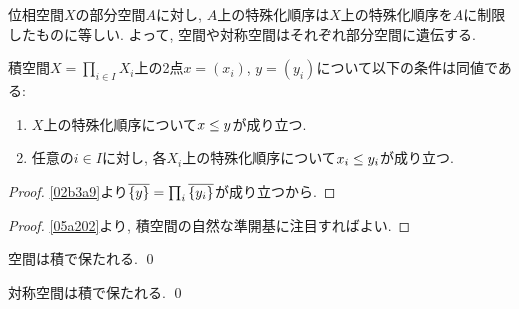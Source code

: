 \documentclass[uplatex, dvipdfmx, a4paper, 12pt, class=jsbook, crop=false]{standalone}
\begin{document}
位相空間$X$の部分空間$A$に対し, $A$上の特殊化順序は$X$上の特殊化順序を$A$に制限したものに等しい.
よって, 空間や対称空間はそれぞれ部分空間に遺伝する.

\begin{proposition}
	\label{a1a202}
	積空間$X = \prod_{i \in I} X_i$上の2点$x = (x_i)$, $y = (y_i)$について以下の条件は同値である:
	\begin{enumerate}
		\item $X$上の特殊化順序について$x \leq y$が成り立つ.
		\item 任意の$i \in I$に対し, 各$X_i$上の特殊化順序について$x_i \leq y_i$が成り立つ.
	\end{enumerate}
\end{proposition}

\begin{proof}
	\cref{02b3a9}より$\overline{\{y\}} = \prod_i \overline{\{y_i\}}$が成り立つから.
\end{proof}

\begin{proof}
	\cref{05a202}より, 積空間の自然な準開基に注目すればよい.
\end{proof}

\begin{corollary}
	空間は積で保たれる.
	\qed
\end{corollary}

\begin{corollary}
	対称空間は積で保たれる.
	\qed
\end{corollary}
\end{document}

